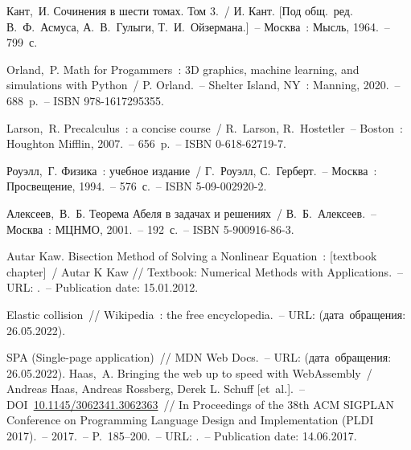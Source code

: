 \begingroup
\renewcommand{\section}[2]{\Anonchapter{Список использованных источников}\vspace{-1em}}
\begin{thebibliography}{00}

      Кант,~И. Сочинения в шести томах. Том 3.~/ И. Кант. [Под общ.~ред. В.~Ф.~Асмуса, А.~В.~Гулыги, Т.~И.~Ойзермана.]~--
      Москва~: Мысль, 1964.~--
      799~с.
    
      Orland,~P. Math for Progammers~: 3D graphics, machine learning, and simulations with Python~/ P. Orland.~--
      Shelter Island, NY~: Manning, 2020.~--
      688~p.~--
      ISBN 978-1617295355.
      
      Larson,~R. Precalculus~: a concise course~/ R.~Larson, R.~Hostetler~--
      Boston~: Houghton Mifflin, 2007.~--
      656~p.~--
      ISBN 0-618-62719-7.
      
      Роуэлл,~Г. Физика~: учебное издание~/ Г.~Роуэлл, С.~Герберт.~--
      Москва~: Просвещение, 1994.~--
      576~с.~--
      ISBN 5-09-002920-2.
      
      Алексеев,~В.~Б. Теорема Абеля в задачах и решениях~/ В.~Б.~Алексеев.~--
      Москва~: МЦНМО, 2001.~--
      192~с.~--
      ISBN 5-900916-86-3.
      
      Autar Kaw. Bisection Method of Solving a Nonlinear Equation~: [textbook chapter]~/ Autar K Kaw //
      Textbook: Numerical Methods with Applications.~--
      URL: \underline{}.~--
      Publication date: 15.01.2012.
      
      Elastic collision~// Wikipedia~: the free encyclopedia.~--
      URL: \underline{}
      (дата~обращения: 26.05.2022).
      
      SPA (Single-page application)~// MDN Web Docs.~--
      URL: \underline{}
      (дата~обращения: 26.05.2022). 
      Haas,~A. Bringing the web up to speed with WebAssembly~/
      Andreas Haas, Andreas Rossberg, Derek L. Schuff [et~al.].~--
      DOI~\href{https://doi.org/10.1145/3062341.3062363}{10.1145/3062341.3062363}~//
      In Proceedings of the 38th ACM SIGPLAN Conference on Programming Language Design and Implementation (PLDI 2017).~--
      2017.~--
      P.~185--200.~--
      URL: \underline{}.~--
      Publication date: 14.06.2017.
      

\end{thebibliography}
